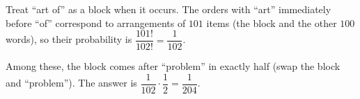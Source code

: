 Treat ``art of'' as a block when it occurs. The orders with ``art'' immediately before ``of'' correspond to arrangements of $101$ items (the block and the other $100$ words), so their probability is $\dfrac{101!}{102!}=\dfrac1{102}$.

Among these, the block comes after ``problem'' in exactly half (swap the block and ``problem''). The answer is $\dfrac1{102}\cdot\dfrac12=\boxed{\dfrac1{204}}$.
